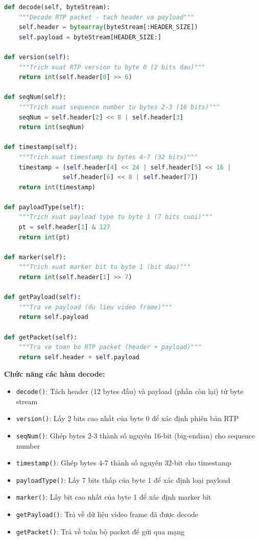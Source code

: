 \begin{lstlisting}[language=Python, caption={RTP Decode Methods}]
def decode(self, byteStream):
    """Decode RTP packet - tach header va payload"""
    self.header = bytearray(byteStream[:HEADER_SIZE])
    self.payload = byteStream[HEADER_SIZE:]

def version(self):
    """Trich xuat RTP version tu byte 0 (2 bits dau)"""
    return int(self.header[0] >> 6)

def seqNum(self):
    """Trich xuat sequence number tu bytes 2-3 (16 bits)"""
    seqNum = self.header[2] << 8 | self.header[3]
    return int(seqNum)

def timestamp(self):
    """Trich xuat timestamp tu bytes 4-7 (32 bits)"""
    timestamp = (self.header[4] << 24 | self.header[5] << 16 |
                self.header[6] << 8 | self.header[7])
    return int(timestamp)

def payloadType(self):
    """Trich xuat payload type tu byte 1 (7 bits cuoi)"""
    pt = self.header[1] & 127
    return int(pt)

def marker(self):
    """Trich xuat marker bit tu byte 1 (bit dau)"""
    return int(self.header[1] >> 7)

def getPayload(self):
    """Tra ve payload (du lieu video frame)"""
    return self.payload

def getPacket(self):
    """Tra ve toan bo RTP packet (header + payload)"""
    return self.header + self.payload
\end{lstlisting}

\textbf{Chức năng các hàm decode:}
\begin{itemize}
    \item \texttt{decode()}: Tách header (12 bytes đầu) và payload (phần còn lại) từ byte stream
    \item \texttt{version()}: Lấy 2 bits cao nhất của byte 0 để xác định phiên bản RTP
    \item \texttt{seqNum()}: Ghép bytes 2-3 thành số nguyên 16-bit (big-endian) cho sequence number
    \item \texttt{timestamp()}: Ghép bytes 4-7 thành số nguyên 32-bit cho timestamp
    \item \texttt{payloadType()}: Lấy 7 bits thấp của byte 1 để xác định loại payload
    \item \texttt{marker()}: Lấy bit cao nhất của byte 1 để xác định marker bit
    \item \texttt{getPayload()}: Trả về dữ liệu video frame đã được decode
    \item \texttt{getPacket()}: Trả về toàn bộ packet để gửi qua mạng
\end{itemize}


